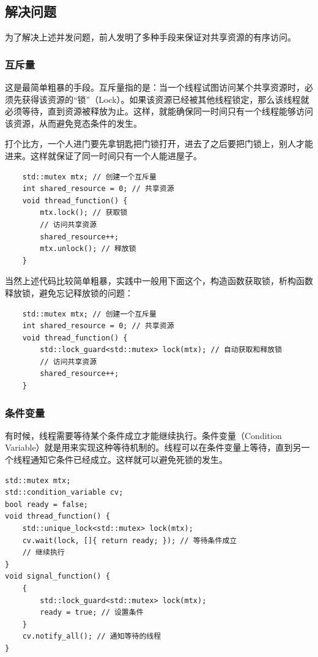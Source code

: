 \subsection{解决问题}

为了解决上述并发问题，前人发明了多种手段来保证对共享资源的有序访问。

\subsubsection{互斥量}

这是最简单粗暴的手段。互斥量指的是：当一个线程试图访问某个共享资源时，必须先获得该资源的“锁”（Lock）。如果该资源已经被其他线程锁定，那么该线程就必须等待，直到资源被释放为止。这样，就能确保同一时间只有一个线程能够访问该资源，从而避免竞态条件的发生。

打个比方，一个人进门要先拿钥匙把门锁打开，进去了之后要把门锁上，别人才能进来。这样就保证了同一时间只有一个人能进屋子。

\begin{verbatim}
    std::mutex mtx; // 创建一个互斥量
    int shared_resource = 0; // 共享资源
    void thread_function() {
        mtx.lock(); // 获取锁
        // 访问共享资源
        shared_resource++;
        mtx.unlock(); // 释放锁
    }
\end{verbatim}
当然上述代码比较简单粗暴，实践中一般用下面这个，构造函数获取锁，析构函数释放锁，避免忘记释放锁的问题：
\begin{verbatim}
    std::mutex mtx; // 创建一个互斥量
    int shared_resource = 0; // 共享资源
    void thread_function() {
        std::lock_guard<std::mutex> lock(mtx); // 自动获取和释放锁
        // 访问共享资源
        shared_resource++;
    }
\end{verbatim}

\subsubsection{条件变量}

有时候，线程需要等待某个条件成立才能继续执行。条件变量（Condition Variable）就是用来实现这种等待机制的。线程可以在条件变量上等待，直到另一个线程通知它条件已经成立。这样就可以避免死锁的发生。

\begin{verbatim}
std::mutex mtx;
std::condition_variable cv;
bool ready = false;
void thread_function() {
    std::unique_lock<std::mutex> lock(mtx);
    cv.wait(lock, []{ return ready; }); // 等待条件成立
    // 继续执行
}
void signal_function() {
    {
        std::lock_guard<std::mutex> lock(mtx);
        ready = true; // 设置条件
    }
    cv.notify_all(); // 通知等待的线程
}
\end{verbatim}

